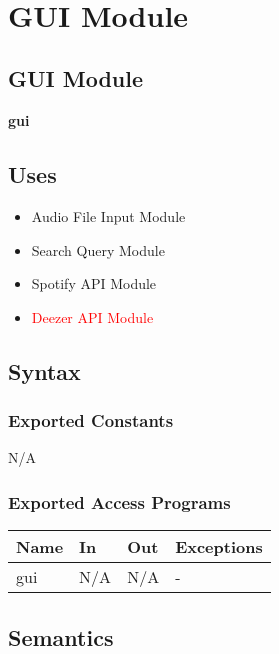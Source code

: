 \documentclass[12pt, titlepage]{article}
\begin{document}
\newpage
~\newpage

\section{GUI Module} \label{Module}

\subsection{GUI Module}
\textbf{gui}

\subsection{Uses}
\begin{itemize}
  \item Audio File Input Module
  \item Search Query Module
  \item Spotify API Module
  \item \textcolor{red}{Deezer API Module}
\end{itemize}

\subsection{Syntax}

\subsubsection{Exported Constants}
N/A

\subsubsection{Exported Access Programs}

\begin{center}
\begin{tabular}{p{2cm} p{4cm} p{4cm} p{2cm}}
\hline
\textbf{Name} & \textbf{In} & \textbf{Out} & \textbf{Exceptions}\\
\hline%
gui &N/A &N/A &-\\

\hline
\end{tabular}
\end{center}

\subsection{Semantics}
\end{document}
